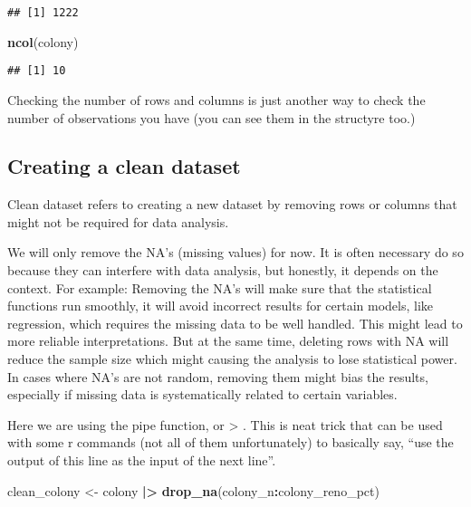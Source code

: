 \documentclass[
]{article}
\newenvironment{Shaded}{\begin{snugshade}}{\end{snugshade}}
\newcommand{\FunctionTok}[1]{\textcolor[rgb]{0.13,0.29,0.53}{\textbf{#1}}}
\newcommand{\NormalTok}[1]{#1}
\newcommand{\OtherTok}[1]{\textcolor[rgb]{0.56,0.35,0.01}{#1}}
\newcommand{\SpecialCharTok}[1]{\textcolor[rgb]{0.81,0.36,0.00}{\textbf{#1}}}
\begin{document}
\begin{verbatim}
## [1] 1222
\end{verbatim}

\begin{Shaded}
\begin{Highlighting}[]
\FunctionTok{ncol}\NormalTok{(colony)}
\end{Highlighting}
\end{Shaded}

\begin{verbatim}
## [1] 10
\end{verbatim}

Checking the number of rows and columns is just another way to check the
number of observations you have (you can see them in the structyre too.)

\subsection{Creating a clean dataset}\label{creating-a-clean-dataset}

Clean dataset refers to creating a new dataset by removing rows or
columns that might not be required for data analysis.

We will only remove the NA's (missing values) for now. It is often
necessary do so because they can interfere with data analysis, but
honestly, it depends on the context. For example: Removing the NA's will
make sure that the statistical functions run smoothly, it will avoid
incorrect results for certain models, like regression, which requires
the missing data to be well handled. This might lead to more reliable
interpretations. But at the same time, deleting rows with NA will reduce
the sample size which might causing the analysis to lose statistical
power. In cases where NA's are not random, removing them might bias the
results, especially if missing data is systematically related to certain
variables.

Here we are using the pipe function, or \textbar\textgreater{} . This is
neat trick that can be used with some r commands (not all of them
unfortunately) to basically say, ``use the output of this line as the
input of the next line''.

\begin{Shaded}
\begin{Highlighting}[]
\NormalTok{clean\_colony }\OtherTok{\textless{}{-}}\NormalTok{ colony }\SpecialCharTok{|\textgreater{}} 
  \FunctionTok{drop\_na}\NormalTok{(colony\_n}\SpecialCharTok{:}\NormalTok{colony\_reno\_pct) }
\end{Highlighting}
\end{Shaded}
\end{document}
